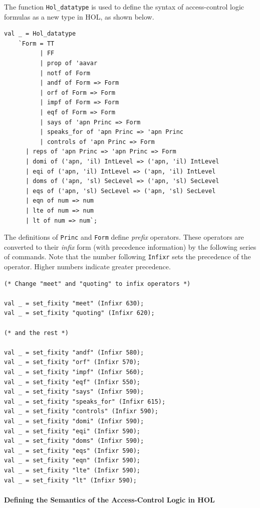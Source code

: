 The function \texttt{Hol\_datatype} is used to define the syntax of
access-control logic formulas as a new type in HOL, as shown below.
\begin{session}
\begin{verbatim}
val _ = Hol_datatype
    `Form = TT
          | FF
          | prop of 'aavar
          | notf of Form
          | andf of Form => Form
          | orf of Form => Form
          | impf of Form => Form
          | eqf of Form => Form
          | says of 'apn Princ => Form
          | speaks_for of 'apn Princ => 'apn Princ
          | controls of 'apn Princ => Form
	  | reps of 'apn Princ => 'apn Princ => Form
	  | domi of ('apn, 'il) IntLevel => ('apn, 'il) IntLevel
	  | eqi of ('apn, 'il) IntLevel => ('apn, 'il) IntLevel
	  | doms of ('apn, 'sl) SecLevel => ('apn, 'sl) SecLevel
	  | eqs of ('apn, 'sl) SecLevel => ('apn, 'sl) SecLevel
	  | eqn of num => num
	  | lte of num => num
	  | lt of num => num`;
\end{verbatim}
\end{session}

The definitions of \texttt{Princ} and \texttt{Form} define
\emph{prefix} operators.  These operators are converted to their
\emph{infix} form (with precedence information) by the following
series of commands. Note that the number following \texttt{Infixr}
sets the precedence of the operator.  Higher numbers indicate greater
precedence.

\begin{session}
\begin{verbatim}
(* Change "meet" and "quoting" to infix operators *)

val _ = set_fixity "meet" (Infixr 630);
val _ = set_fixity "quoting" (Infixr 620);

(* and the rest *)

val _ = set_fixity "andf" (Infixr 580);
val _ = set_fixity "orf" (Infixr 570);
val _ = set_fixity "impf" (Infixr 560);
val _ = set_fixity "eqf" (Infixr 550);
val _ = set_fixity "says" (Infixr 590);
val _ = set_fixity "speaks_for" (Infixr 615);
val _ = set_fixity "controls" (Infixr 590);
val _ = set_fixity "domi" (Infixr 590);
val _ = set_fixity "eqi" (Infixr 590);
val _ = set_fixity "doms" (Infixr 590);
val _ = set_fixity "eqs" (Infixr 590);
val _ = set_fixity "eqn" (Infixr 590);
val _ = set_fixity "lte" (Infixr 590);
val _ = set_fixity "lt" (Infixr 590);
\end{verbatim}
\end{session}

\paragraph{Defining the Semantics of the Access-Control Logic in HOL}
\label{sec:defin-semant-access}

